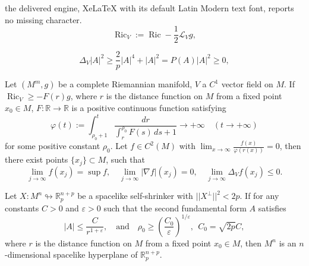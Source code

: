 \documentclass[10pt,a4paper]{amsart}
\begin{document}
the delivered engine, XeLaTeX with its default Latin Modern text font, reports no missing character.
\begin{equation}\label{VRiccTensor}
	\operatorname{Ric}_V := \operatorname{Ric} - \frac{1}{2} \mathcal{L}_V g,
\end{equation}

\begin{equation}\label{ineqaux2}
\Delta_V |A|^{2}\geq\frac{2}{p}|A|^{4}+|A|^{2} = P(A)  |A|^2 \geq 0,
\end{equation}

\begin{lemma}\label{lema2}
	Let $(M^m, g)$ be a complete Riemannian manifold, $ V $ a $ C^1 $ vector field on $ M $. If $ \operatorname{Ric}_V \geq -F(r)g$, where $ r $ is the distance function on $ M $ from a fixed point $ x_0 \in M $, $ F: \mathbb{R} \to \mathbb{R} $ is a positive continuous function satisfying
	\begin{equation}\label{maximumprinciple2}
	\varphi(t) := \int_{\rho_0 + 1}^t \frac{dr}{\displaystyle\int_{r}^{\rho_0} F(s) \, ds + 1} \to +\infty \quad (t \to +\infty)
	\end{equation}
	for some positive constant $ \rho_0 $. Let $ f \in C^2(M) $ with $ \displaystyle\lim_{x \to \infty} \frac{f(x)}{\varphi(r(x))} = 0 $, then there exist points \( \{x_j\} \subset M \), such that
	\begin{equation}
	\lim_{j \to \infty} f(x_j) = \sup f, \quad \lim_{j \to \infty} |\nabla f|(x_j) = 0, \quad \lim_{j \to \infty} \Delta_V f(x_j) \leq 0.
	\end{equation}
\end{lemma}

\begin{theorem}
	Let $X:M^n\looparrowright\mathbb R^{n+p}_{p}$ be a spacelike self-shrinker with  $||X^\perp||^2 < 2p$. If for any constants $C>0$ and $\varepsilon > 0$ such that the second fundamental form $A$ satisfies
	$$
	|A| \leq \dfrac{C}{r^{1+\varepsilon}}, \quad \text{and} \quad \rho_0 \geq \left( \dfrac{C_0}{\varepsilon} \right)^{1/\varepsilon},  ~~ C_0 = \sqrt{2p}C,
	$$
	where $ r $ is the distance function on $ M $ from a fixed point $ x_0 \in M $, then $M^n$ is an $n$-dimensional spacelike hyperplane of $\mathbb R^{n+p}_{p}$.
\end{theorem}
\end{document}
